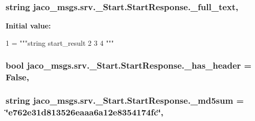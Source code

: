 \subsubsection[{\texorpdfstring{\+\_\+full\+\_\+text}{_full_text}}]{\setlength{\rightskip}{0pt plus 5cm}string jaco\+\_\+msgs.\+srv.\+\_\+\+Start.\+Start\+Response.\+\_\+full\+\_\+text\hspace{0.3cm}{\ttfamily [static]}, {\ttfamily [private]}}\hypertarget{classjaco__msgs_1_1srv_1_1__Start_1_1StartResponse_a8469c4a6e7d49f298356e2dc5268e62d}{}\label{classjaco__msgs_1_1srv_1_1__Start_1_1StartResponse_a8469c4a6e7d49f298356e2dc5268e62d}
{\bfseries Initial value\+:}
\begin{DoxyCode}
1 = \textcolor{stringliteral}{"""string start\_result}
2 \textcolor{stringliteral}{}
3 \textcolor{stringliteral}{}
4 \textcolor{stringliteral}{"""}
\end{DoxyCode}
\subsubsection[{\texorpdfstring{\+\_\+has\+\_\+header}{_has_header}}]{\setlength{\rightskip}{0pt plus 5cm}bool jaco\+\_\+msgs.\+srv.\+\_\+\+Start.\+Start\+Response.\+\_\+has\+\_\+header = False\hspace{0.3cm}{\ttfamily [static]}, {\ttfamily [private]}}\hypertarget{classjaco__msgs_1_1srv_1_1__Start_1_1StartResponse_ab7f7782ea21c3c3e2d5ddc6e911b7b92}{}\label{classjaco__msgs_1_1srv_1_1__Start_1_1StartResponse_ab7f7782ea21c3c3e2d5ddc6e911b7b92}
\subsubsection[{\texorpdfstring{\+\_\+md5sum}{_md5sum}}]{\setlength{\rightskip}{0pt plus 5cm}string jaco\+\_\+msgs.\+srv.\+\_\+\+Start.\+Start\+Response.\+\_\+md5sum = \char`\"{}e762e31d813526eaaa6a12e8354174fc\char`\"{}\hspace{0.3cm}{\ttfamily [static]}, {\ttfamily [private]}}\hypertarget{classjaco__msgs_1_1srv_1_1__Start_1_1StartResponse_a85e71a0124f72af28952a490a870efd3}{}\label{classjaco__msgs_1_1srv_1_1__Start_1_1StartResponse_a85e71a0124f72af28952a490a870efd3}
